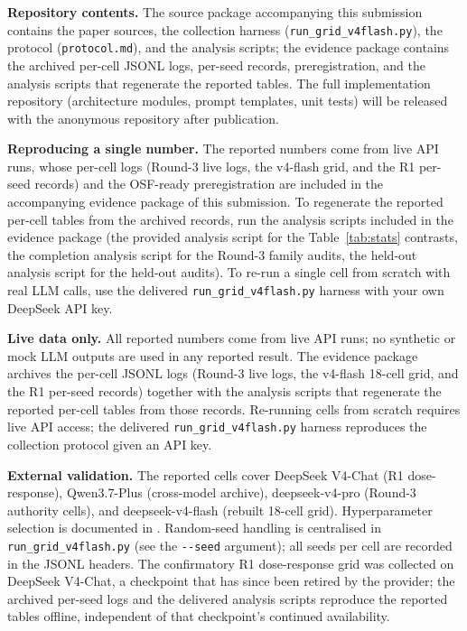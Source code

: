 \documentclass[11pt]{article}
\begin{document}
\noindent\textbf{Repository contents.}
The source package accompanying this submission contains the paper sources, the collection harness (\texttt{run\_grid\_v4flash.py}), the protocol (\texttt{protocol.md}), and the analysis scripts; the evidence package contains the archived per-cell JSONL logs, per-seed records, preregistration, and the analysis scripts that regenerate the reported tables. The full implementation repository (architecture modules, prompt templates, unit tests) will be released with the anonymous repository after publication.

\noindent\textbf{Reproducing a single number.}
The reported numbers come from live API runs, whose per-cell logs (Round-3 live logs, the v4-flash grid, and the R1 per-seed records) and the OSF-ready preregistration are included in the accompanying evidence package of this submission. To regenerate the reported per-cell tables from the archived records, run the analysis scripts included in the evidence package (the provided analysis script for the Table~\ref{tab:stats} contrasts, the completion analysis script for the Round-3 family audits, the held-out analysis script for the held-out audits). To re-run a single cell from scratch with real LLM calls, use the delivered \texttt{run\_grid\_v4flash.py} harness with your own DeepSeek API key.

\noindent\textbf{Live data only.}
All reported numbers come from live API runs; no synthetic or mock LLM outputs are used in any reported result. The evidence package archives the per-cell JSONL logs (Round-3 live logs, the v4-flash 18-cell grid, and the R1 per-seed records) together with the analysis scripts that regenerate the reported per-cell tables from those records. Re-running cells from scratch requires live API access; the delivered \texttt{run\_grid\_v4flash.py} harness reproduces the collection protocol given an API key.

\noindent\textbf{External validation.}
The reported cells cover DeepSeek V4-Chat (R1 dose-response), Qwen3.7-Plus (cross-model archive), deepseek-v4-pro (Round-3 authority cells), and deepseek-v4-flash (rebuilt 18-cell grid). Hyperparameter selection is documented in . Random-seed handling is centralised in \texttt{run\_grid\_v4flash.py} (see the \texttt{-{}-seed} argument); all seeds per cell are recorded in the JSONL headers. The confirmatory R1 dose-response grid was collected on DeepSeek V4-Chat, a checkpoint that has since been retired by the provider; the archived per-seed logs and the delivered analysis scripts reproduce the reported tables offline, independent of that checkpoint's continued availability.
\end{document}
